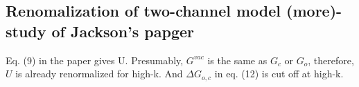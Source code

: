 \subsection{Renomalization of two-channel model (more)-study of Jackson's papger\cite{JacksonNarrow}}
Eq. (9) in the paper \cite{JacksonNarrow} gives U.  Presumably,  $G^{vac}$ is the same as $G_c$ or $G_o$, therefore, $U$ is already renormalized for high-k. And $\Delta{G_{o,c}}$ in eq. (12) is cut off at high-k. 

